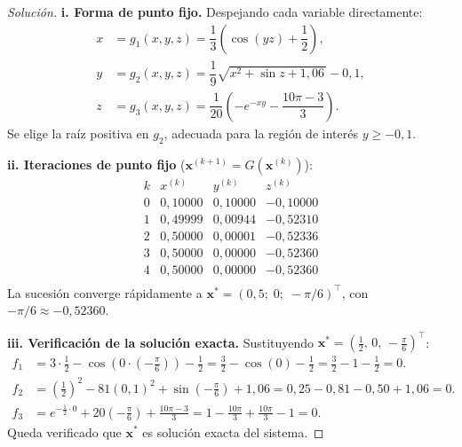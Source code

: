 \documentclass[a4,11pt]{aleph-notas}
\begin{document}
\begin{proof}[Solución]\hspace{0pt}

\textbf{i. Forma de punto fijo.}
Despejando cada variable directamente:
\begin{align*}
    x &= g_1(x,y,z) = \dfrac{1}{3}\!\left(\cos(yz)+\dfrac{1}{2}\right),\\[6pt]
    y &= g_2(x,y,z) = \dfrac{1}{9}\sqrt{x^2+\sin z+1{,}06\,}-0{,}1,\\[6pt]
    z &= g_3(x,y,z) = \dfrac{1}{20}\!\left(-e^{-xy}-\dfrac{10\pi-3}{3}\right).
\end{align*}
Se elige la raíz positiva en $g_2$, adecuada para la región de interés $y\geq -0{,}1$.

\medskip
\textbf{ii. Iteraciones de punto fijo} ($\mathbf{x}^{(k+1)}=G\!\left(\mathbf{x}^{(k)}\right)$):
\[
    \begin{array}{c|ccc}
        k & x^{(k)} & y^{(k)} & z^{(k)} \\ \hline
        0 & 0{,}10000 & 0{,}10000 & -0{,}10000 \\
        1 & 0{,}49999 & 0{,}00944 & -0{,}52310 \\
        2 & 0{,}50000 & 0{,}00001 & -0{,}52336 \\
        3 & 0{,}50000 & 0{,}00000 & -0{,}52360 \\
        4 & 0{,}50000 & 0{,}00000 & -0{,}52360 \\
    \end{array}
\]
La sucesión converge rápidamente a
$\mathbf{x}^*=(0{,}5;\;0;\;-\pi/6)^\top$, con $-\pi/6\approx-0{,}52360$.

\medskip
\textbf{iii. Verificación de la solución exacta.}
Sustituyendo $\mathbf{x}^*=\!\left(\tfrac{1}{2},\,0,\,-\tfrac{\pi}{6}\right)^\top$:
\begin{align*}
    f_1 &= 3\cdot\frac{1}{2}-\cos\!\left(0\cdot\!\left(-\frac{\pi}{6}\right)\right)-\frac{1}{2}
         = \frac{3}{2}-\cos(0)-\frac{1}{2}
         = \frac{3}{2}-1-\frac{1}{2}=0.\\[8pt]
    f_2 &= \left(\frac{1}{2}\right)^{\!2}-81(0{,}1)^2+\sin\!\left(-\frac{\pi}{6}\right)+1{,}06
         = 0{,}25-0{,}81-0{,}50+1{,}06=0.\\[8pt]
    f_3 &= e^{-\frac{1}{2}\cdot 0}+20\!\left(-\frac{\pi}{6}\right)+\frac{10\pi-3}{3}
         = 1-\frac{10\pi}{3}+\frac{10\pi}{3}-1=0.
\end{align*}
Queda verificado que $\mathbf{x}^*$ es solución exacta del sistema.

\end{proof}
\end{document}
